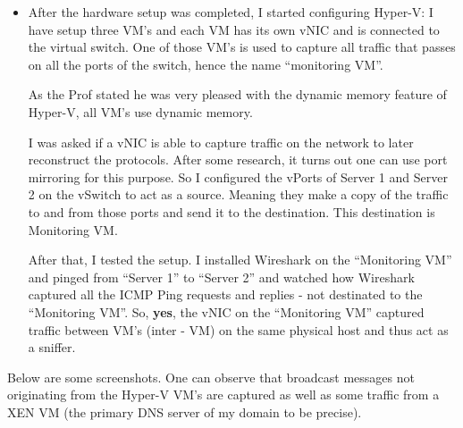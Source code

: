 \documentclass[11pt, a4paper]{article}
\begin{document}
\begin{itemize}
\item After the hardware setup was completed, I started configuring Hyper-V: I have setup three VM's and each VM has its own vNIC and is connected to the virtual switch. One of those VM's is used to capture all traffic that passes on all the ports of the switch, hence the name ``monitoring VM''.

As the Prof stated he was very pleased with the dynamic memory feature of Hyper-V, all VM's use dynamic memory.

I was asked if a vNIC is able to capture traffic on the network to later reconstruct the protocols. After some research, it turns out one can use port mirroring for this purpose. So I configured the vPorts of Server 1 and Server 2 on the vSwitch to act as a source. Meaning they make a copy of the traffic to and from those ports and send it to the destination. This destination is Monitoring VM.

After that, I tested the setup. I installed Wireshark on the ``Monitoring VM'' and pinged from ``Server 1'' to ``Server 2'' and watched how Wireshark captured all the ICMP Ping requests and replies - not destinated to the ``Monitoring VM''. So, \textbf{yes}, the vNIC on the ``Monitoring VM'' captured traffic between VM's (inter - VM) on the same physical host and thus act as a sniffer.
\end{itemize}

Below are some screenshots. One can observe that broadcast messages not originating from the Hyper-V VM's are captured as well as some traffic from a XEN VM (the primary DNS server of my domain to be precise).
\end{document}
